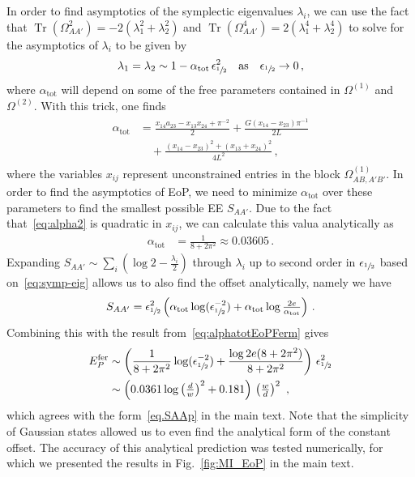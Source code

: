 \documentclass[prl,a4paper,notitlepage,twocolumn,superscriptaddress,longbibliography,reprint]{revtex4-2}
\newcommand{\Tr}{\operatorname{Tr}}
\begin{document}
In order to find asymptotics of the symplectic eigenvalues $\lambda_i$, we can use the fact that $\Tr(\Omega_{AA'}^2)=-2(\lambda_1^2+\lambda_2^2)$ and $\Tr(\Omega_{AA'}^4)=2(\lambda_1^4+\lambda_2^4)$ to solve for the asymptotics of $\lambda_i$ to be given by
\begin{align}
    \lambda_1=\lambda_2\sim 1-\alpha_{\mathrm{tot}}\,\epsilon_{\sfrac{1}{2}}^2\quad \text{as}\quad \epsilon_{\sfrac{1}{2}}\to 0\,,\label{eq:symp-eig}
\end{align}
where $\alpha_{\mathrm{tot}}$ will depend on some of the free parameters contained in $\Omega^{(1)}$ and $\Omega^{(2)}$. With this trick, one finds
\begin{align}
\begin{split}
    \alpha_{\mathrm{tot}}&=\frac{x_{14}a_{23}-x_{13}x_{24}+\pi^{-2}}{2}+\frac{G(x_{14}-x_{23})\pi^{-1}}{2L}\\
    &\quad +\frac{(x_{14}-x_{23})^2+(x_{13}+x_{24})^2}{4L^2}\,,\label{eq:alpha2}
\end{split}
\end{align}
where the variables $x_{ij}$ represent unconstrained entries in the block $\Omega^{(1)}_{AB,A'B'}$. In order to find the asymptotics of EoP, we need to minimize $\alpha_{\mathrm{tot}}$ over these parameters to find the smallest possible EE $S_{AA'}$. Due to the fact that~\eqref{eq:alpha2} is quadratic in $x_{ij}$, we can calculate this valua analytically as
\begin{align}\label{eq:alphatotEoPFerm}
    \alpha_{\mathrm{tot}}&=\frac{1}{8+2\pi^2}\approx 0.03605\,.
\end{align}
Expanding $S_{AA'}\sim \sum_i(\log{2}-\tfrac{\lambda_i}{2})$ through $\lambda_i$ up to second order in $\epsilon_{\sfrac{1}{2}}$ based on~\eqref{eq:symp-eig} allows us to also find the offset analytically, namely we have
\begin{align}
    S_{AA'}=\epsilon_{\sfrac{1}{2}}^2\left(\alpha_{\mathrm{tot}}\log(\epsilon_{\sfrac{1}{2}}^{-2})+\alpha_{\mathrm{tot}} \log{\tfrac{2e}{\alpha_{\mathrm{tot}}}}\right)\,.
\end{align}
Combining this with the result from~\eqref{eq:alphatotEoPFerm} gives
\begin{align}
\label{eq:eopFerm11}
    E_P^\text{fer}&\sim \left(\frac{1}{8+2\pi^2} \log(\epsilon_{\sfrac{1}{2}}^{-2})+ \frac{\log 2e (8+2\pi^2)}{8+2\pi^2} \right)\, \epsilon_{\sfrac{1}{2}}^2 \nonumber\\
    &\sim \left(0.0361\log\left(\tfrac{d}{w}\right)^2 +0.181\right)\, \left(\tfrac{w}{d}\right)^2  \ ,
\end{align}
which agrees with the form~\eqref{eq.SAAp} in the main text. Note that the simplicity of Gaussian states allowed us to even find the analytical form of the constant offset. The accuracy of this analytical prediction was tested numerically, for which we presented the results in Fig.~\ref{fig:MI_EoP} in the main text.
\end{document}
